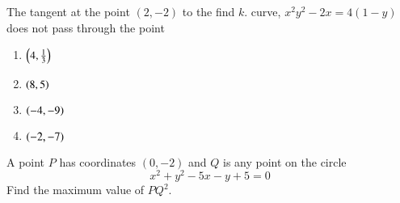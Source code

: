 \documentclass[journal,12pt,twocolumn]{IEEEtran}
\begin{document}
%
\begin{problem}
The tangent at the point $(2, -2)$ to the find $k$.
curve, $x^2y^2-2x = 4(1 - y)$ does not pass through the
point
\begin{enumerate}
\item $\left(4, \frac{1}{3}\right)$
\item $\left(8, 5\right)$
\item $\left(-4, -9\right)$
\item $\left(-2, -7\right)$
\end{enumerate}
\end{problem}
%
%
%
%
\begin{problem}
A point $P$ has coordinates $(0, -2)$ and $Q$ is any point on the circle
%
\begin{equation}
x^2+y^2-5x-y+5=0
\end{equation}
Find the maximum value of $PQ^2$.
\end{problem}		
%
%
%
%
%
\end{document}

